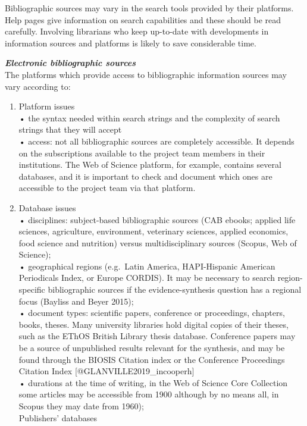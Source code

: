 \documentclass[
  letterpaper,
  DIV=11,
  numbers=noendperiod]{scrreprt}
\begin{document}
Bibliographic sources may vary in the search tools provided by their
platforms. Help pages give information on search capabilities and these
should be read carefully. Involving librarians who keep up-to-date with
developments in information sources and platforms is likely to save
considerable time.

\textbf{\emph{Electronic bibliographic sources}}\\
The platforms which provide access to bibliographic information sources
may vary according to:

\begin{enumerate}
\def\labelenumi{\arabic{enumi}.}
\item
  Platform issues\\
  • the syntax needed within search strings and the complexity of search
  strings that they will accept\\
  • access: not all bibliographic sources are completely accessible. It
  depends on the subscriptions available to the project team members in
  their institutions. The Web of Science platform, for example, contains
  several databases, and it is important to check and document which
  ones are accessible to the project team via that platform.
\item
  Database issues\\
  • disciplines: subject-based bibliographic sources (CAB ebooks;
  applied life sciences, agriculture, environment, veterinary sciences,
  applied economics, food science and nutrition) versus
  multidisciplinary sources (Scopus, Web of Science);\\
  • geographical regions (e.g.~Latin America, HAPI-Hispanic American
  Periodicals Index, or Europe CORDIS). It may be necessary to search
  region-specific bibliographic sources if the evidence-synthesis
  question has a regional focus (Bayliss and Beyer 2015);\\
  • document types: scientific papers, conference or proceedings,
  chapters, books, theses. Many university libraries hold digital copies
  of their theses, such as the EThOS British Library thesis database.
  Conference papers may be a source of unpublished results relevant for
  the synthesis, and may be found through the BIOSIS Citation index or
  the Conference Proceedings Citation Index
  {[}@GLANVILLE2019\_incooperh{]}\\
  • durations at the time of writing, in the Web of Science Core
  Collection some articles may be accessible from 1900 although by no
  means all, in Scopus they may date from 1960);\\
  Publishers' databases
\end{enumerate}
\end{document}
